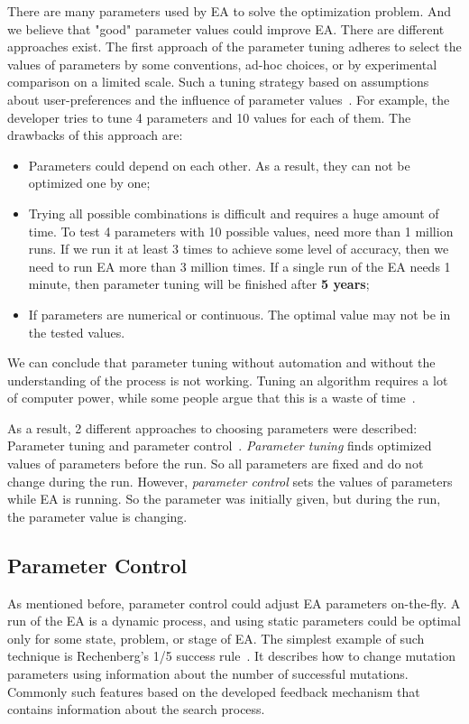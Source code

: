 There are many parameters used by EA to solve the optimization problem. And we believe that "good" parameter values could improve EA. There are different approaches exist. 
The first approach of the parameter tuning adheres to select the values of parameters by some conventions, ad-hoc choices, or by experimental comparison on a limited scale. Such a tuning strategy based on assumptions about user-preferences and the influence of parameter values~\cite{eiben03,eiben11}. For example, the developer tries to tune 4 parameters and 10 values for each of them.
The drawbacks of this approach are:
\begin{itemize}
	\item Parameters could depend on each other. As a result, they can not be optimized one by one;
	\item Trying all possible combinations is difficult and requires a huge amount of time. To test 4 parameters with 10 possible values, need more than 1 million runs. If we run it at least 3 times to achieve some level of accuracy, then we need to run EA more than 3 million times. If a single run of the EA needs 1 minute, then parameter tuning will be finished after \textbf{5 years};
	\item If parameters are numerical or continuous. The optimal value may not be in the tested values.
\end{itemize}

We can conclude that parameter tuning without automation and without the understanding of the process is not working. Tuning an algorithm requires a lot of computer power,
while some people argue that this is a waste of time~\cite{smit2009comparing}.

As a result, 2 different approaches to choosing parameters were described: Parameter tuning and parameter control~\cite{smit2012parameter,eiben03}.
\textit{Parameter tuning} finds optimized values of parameters before the run. So all parameters are fixed and do not change during the run. However, \textit{parameter control} sets the values of parameters while EA is running. So the parameter was initially given, but during the run, the parameter value is changing. 

\subsection{Parameter Control}
As mentioned before, parameter control could adjust EA parameters on-the-fly. A run of the EA is a dynamic process, and using static parameters could be optimal only for some state, problem, or stage of EA. 
The simplest example of such technique is Rechenberg's 1/5 success rule~\cite{rechenberg1973evolutionsstrategie}. It describes how to change mutation parameters using information about the number of successful mutations. Commonly such features based on the developed feedback mechanism that contains information about the search process.

